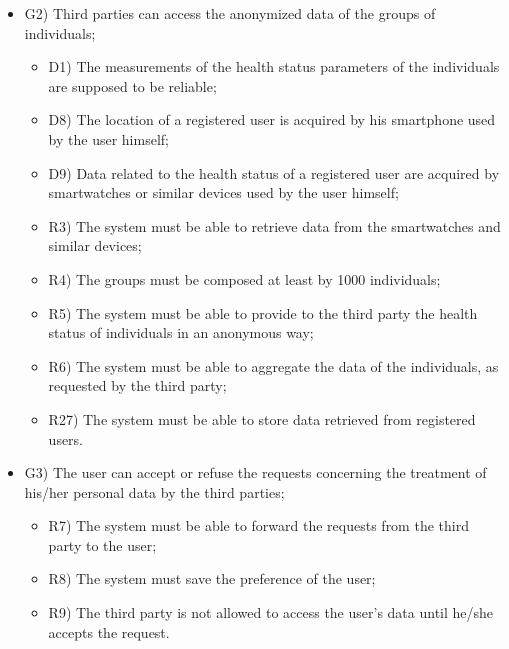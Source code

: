 \documentclass{article}
\begin{document}
\begin{legal}
\begin{legal}
\begin{legal}
\begin{itemize}
{\begin{itemize}
					\end{itemize}
				}
				\item G2) Third parties can access the anonymized data of the groups of individuals;\\
				{\normalfont
					\begin{itemize}
					\item D1) The measurements of the health status parameters of the individuals are supposed to be reliable;\\
	 				\item D8) The location of a registered user is acquired by his smartphone used by the user himself;\\
					\item D9) Data related to the health status of a registered user are acquired by smartwatches or similar devices used by the user himself;\\
					\item R3) The system must be able to retrieve data from the smartwatches and similar devices;\\
					\item R4) The groups must be composed at least by 1000 individuals;\\
					\item R5) The system must be able to provide to the third party the health status of individuals in an anonymous way;\\
					\item R6) The system must be able to aggregate the data of the individuals, as requested by the third party;\\
					\item R27) The system must be able to store data retrieved from registered users.\\
					\end{itemize}
				}
				\item G3) The user can accept or refuse the requests concerning the treatment of his/her personal data by the third parties;\\
				{\normalfont
					\begin{itemize}
					\item R7) The system must be able to forward the requests from the third party to the user;\\
	 				\item R8) The system must save the preference of the user;\\
					\item R9) The third party is not allowed to access the user’s data until he/she accepts the request.\\

\end{itemize}}
\end{itemize}
\end{legal}
\end{legal}
\end{legal}
\end{document}
